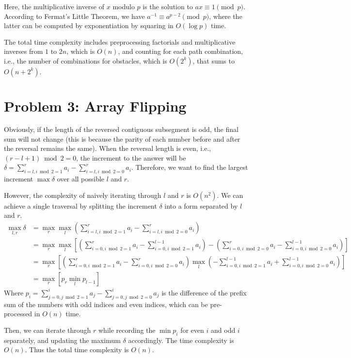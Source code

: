 \documentclass[11pt, a4paper, oneside]{memoir}
\begin{document}
Here, the multiplicative inverse of $x$ modulo $p$ is the solution to $ax \equiv 1 \pmod{p}$.
According to Fermat's Little Theorem, we have $a^{-1} \equiv a^{p-2} \pmod{p}$,
where the latter can be computed by exponentiation by squaring in $O(\log p)$ time.

The total time complexity includes preprocessing factorials and multiplicative inverses from $1$ to $2n$, which is $O(n)$,
and counting for each path combination, i.e., the number of combinations for obstacles, which is $O(2^k)$, that sums to $O(n+2^k)$.

\chapter{Problem 3: Array Flipping}
Obviously, if the length of the reversed contiguous subsegment is odd,
the final sum will not change (this is because the parity of each number before and after the reversal remains the same).
When the reversal length is even, i.e., $(r-l+1) \bmod 2= 0$, the increment to the answer will be $\delta = \sum_{i=l, i \bmod 2=1}^r a_i - \sum_{i=l, i \bmod 2=0}^r a_i$.
Therefore, we want to find the largest increment $\max{\delta}$ over all possible $l$ and $r$.

However, the complexity of naively iterating through $l$ and $r$ is $O(n^2)$. We can achieve a single traversal by splitting the increment $\delta$ into a form separated by $l$ and $r$.
\begin{align*}
  \max_{l, r} \delta &= \max_{r} \max_{l} \left( \sum_{i=l, i \bmod 2=1}^r a_i - \sum_{i=l, i \bmod 2=0}^r a_i \right) \\
  &= \max_{r} \max_{l}  \left[ \left( \sum_{i=0, i \bmod 2=1}^r a_i - \sum_{i=0, i \bmod 2=1}^{l-1} a_i \right) - \left( \sum_{i=0, i \bmod 2=0}^r a_i - \sum_{i=0, i \bmod 2=0}^{l-1} a_i \right) \right] \\
  &= \max_{r} \left[ \left( \sum_{i=0, i \bmod 2=1}^r a_i - \sum_{i=0, i \bmod 2=0}^r a_i \right) \max_{l} \left( - \sum_{i=0, i \bmod 2=1}^{l-1} a_i + \sum_{i=0, i \bmod 2=0}^{l-1} a_i \right) \right] \\
  &= \max_{r} \left[ p_r \min_{l} p_{l-1} \right]
\end{align*}
Where $p_i = \sum_{j=0, j \bmod 2=1}^i a_j - \sum_{j=0, j \bmod 2=0}^i a_j$ is the difference of the prefix sum of the numbers with odd indices and even indices,
which can be pre-processed in $O(n)$ time.

Then, we can iterate through $r$ while recording the $\min p_i$ for even $i$ and odd $i$ separately, and updating the maximum $\delta$ accordingly.
The time complexity is $O(n)$. Thus the total time complexity is $O(n)$.
\end{document}
